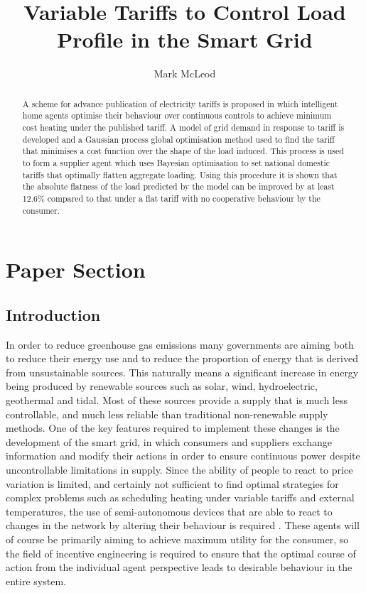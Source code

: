 \documentclass[a4paper, 10 pt, conference]{ieeeconf}  %
\title{\LARGE \bf Variable Tariffs to Control Load Profile in the Smart Grid}
\author{Mark McLeod}
\date{}
\begin{document}
\maketitle
\thispagestyle{empty}
\pagestyle{empty}

\section{Paper Section}
\begin{abstract}
A scheme for advance publication of electricity tariffs is proposed in which intelligent home agents optimise their behaviour over continuous controls to achieve minimum cost heating under the published tariff. A model of grid demand in response to tariff is developed and a Gaussian process global optimisation method used to find the tariff that minimises a cost function over the shape of the load induced. This process is used to form a supplier agent which uses Bayesian optimisation to set national domestic tariffs that optimally flatten aggregate loading. Using this procedure it is shown that the absolute flatness of the load predicted by the model can be improved by at least 12.6\% compared to that under a flat tariff with no cooperative behaviour by the consumer.
\end{abstract}

\subsection{Introduction}

In order to reduce greenhouse gas emissions many governments are aiming both to reduce their energy use and to reduce the proportion of energy that is derived from unsustainable sources. This naturally means a significant increase in energy being produced by renewable sources such as solar, wind, hydroelectric, geothermal and tidal. Most of these sources provide a supply that is much less controllable, and much less reliable than traditional non-renewable supply methods. One of the key features required to implement these changes is the development of the smart grid, in which consumers and suppliers exchange information and modify their actions in order to ensure continuous power despite uncontrollable limitations in supply. Since the ability of people to react to price variation is limited, and certainly not sufficient to find optimal strategies for complex problems such as scheduling heating under variable tariffs and external temperatures, the use of semi-autonomous devices that are able to react to changes in the network by altering their behaviour is required \cite{rogers2012delivering}. These agents will of course be primarily aiming to achieve maximum utility for the consumer, so the field of incentive engineering is required to ensure that the optimal course of action from the individual agent perspective leads to desirable behaviour in the entire system.
\end{document}
